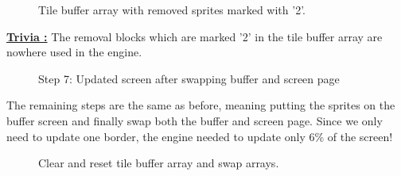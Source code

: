 \documentclass[book.tex]{subfiles}
\begin{document}
\begin{figure}[H]
\centering
 \caption{Tile buffer array with removed sprites marked with '2'.}
 \label{fig:kc4_6_update_array}
\end{figure}

\par
\textbf{\underline{Trivia :}} The removal blocks which are marked '2' in the tile buffer array are nowhere used in the engine.\\
  \par
\pagebreak

\begin{figure}[H]
\centering
 \caption{Step 7: Updated screen after swapping buffer and screen page}
 \label{fig:k4_6_update_final}
\end{figure}


The remaining steps are the same as before, meaning putting the sprites on the buffer screen and finally swap both the buffer and screen page. Since we only need to update one border, the engine needed to update only 6\% of the screen!\\

\begin{figure}[H]
\centering
 \caption{Clear and reset tile buffer array and swap arrays.}
 \label{fig:kc4_6_final}
\end{figure}

\par
\end{document}
